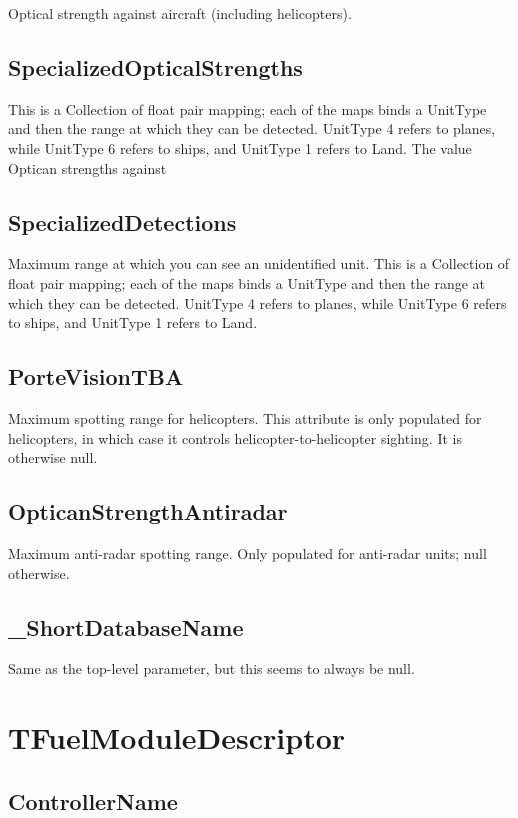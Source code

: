 \documentclass{article}
\begin{document}
Optical strength against aircraft (including helicopters).

\subsection{SpecializedOpticalStrengths}

This is a Collection of float pair mapping; each of the maps binds a UnitType and then the range at which they can be detected. UnitType 4 refers to planes, while UnitType 6 refers to ships, and UnitType 1 refers to Land. The value Optican strengths against 

\subsection{SpecializedDetections}

Maximum range at which you can see an unidentified unit. This is a Collection of float pair mapping; each of the maps binds a UnitType and then the range at which they can be detected. UnitType 4 refers to planes, while UnitType 6 refers to ships, and UnitType 1 refers to Land.

\subsection{PorteVisionTBA}

Maximum spotting range for helicopters. This attribute is only populated for helicopters, in which case it controls helicopter-to-helicopter sighting. It is otherwise null.

\subsection{OpticanStrengthAntiradar}

Maximum anti-radar spotting range. Only populated for anti-radar units; null otherwise.

\subsection{\_ShortDatabaseName}

Same as the top-level parameter, but this seems to always be null.

\section{TFuelModuleDescriptor}

\subsection{ControllerName}
\end{document}
